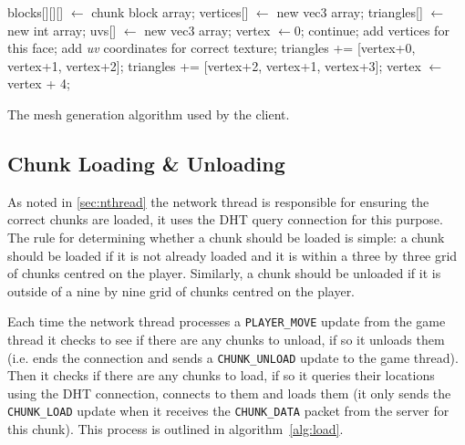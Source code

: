 \documentclass[12pt,notitlepage,a4paper]{report}
\begin{document}
	\begin{algorithm}[!ht]
		\begin{algorithmic}
			\State blocks[][][] $\gets$ chunk block array;
			\State vertices[] $\gets$ new vec3 array;
			\State triangles[] $\gets$ new int array;
			\State uvs[] $\gets$ new vec3 array;
			\State vertex $\gets 0$;
								\State continue;
							\EndIf
							\State add vertices for this face;
							\State add \emph{uv} coordinates for correct texture;
							\State triangles += [vertex+0, vertex+1, vertex+2];
							\State triangles += [vertex+2, vertex+1, vertex+3];
							\State vertex $\gets$ vertex + 4;
						\EndFor
					\EndFor
				\EndFor
			\EndFor
		\end{algorithmic}
		\caption{The mesh generation algorithm used by the client.}
		\label{alg:mesh}
	\end{algorithm}
	
	\subsection{Chunk Loading \& Unloading}
	\label{sec:loading}
	As noted in \cref{sec:nthread} the network thread is responsible for ensuring the correct chunks are loaded, it uses the DHT query connection for this purpose. The rule for determining whether a chunk should be loaded is simple: a chunk should be loaded if it is not already loaded and it is within a three by three grid of chunks centred on the player. Similarly, a chunk should be unloaded if it is outside of a nine by nine grid of chunks centred on the player.
	
	Each time the network thread processes a \texttt{PLAYER\_MOVE} update from the game thread it checks to see if there are any chunks to unload, if so it unloads them (i.e. ends the connection and sends a \texttt{CHUNK\_UNLOAD} update to the game thread). Then it checks if there are any chunks to load, if so it queries their locations using the DHT connection, connects to them and loads them (it only sends the \texttt{CHUNK\_LOAD} update when it receives the \texttt{CHUNK\_DATA} packet from the server for this chunk). This process is outlined in algorithm~\ref{alg:load}.
	
\end{document}

